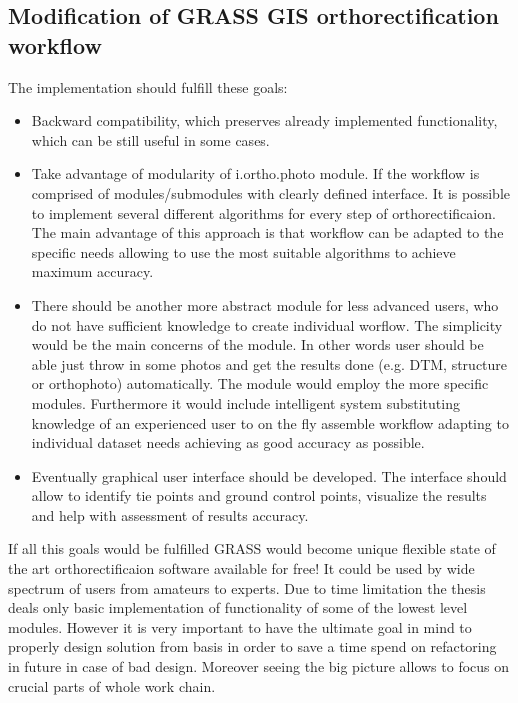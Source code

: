 \documentclass[a4paper,12pt]{article}
\begin{document}
\subsection{Modification of GRASS GIS orthorectification workflow}

The implementation should fulfill these goals:

\begin{itemize}
\item Backward compatibility, which preserves already implemented functionality, which
can be still useful in some cases. 
\item Take advantage of modularity of i.ortho.photo module.
If the workflow is comprised of modules/submodules with clearly defined interface. It is possible to implement
several different algorithms for every step of orthorectificaion. The main advantage of this 
approach is that workflow can be adapted to the specific needs allowing to use 
the most suitable algorithms to achieve maximum accuracy.
\item There should be another more abstract module for less advanced users, who do not have sufficient knowledge to create individual 
worflow. The simplicity would be the main concerns of the module. In other words user should be able just throw in   
 some photos and get the results done (e.g. DTM, structure or orthophoto) automatically. 
The module would employ the more specific modules. Furthermore it would include intelligent system 
substituting knowledge of an experienced user to on the fly assemble workflow adapting to individual 
dataset needs achieving as good accuracy as possible.
\item Eventually graphical user interface should be developed. The interface should 
allow to identify tie points and ground control points, visualize the results and help with assessment of results accuracy.  
\end{itemize}

If all this goals would be fulfilled GRASS would become unique flexible state of the art orthorectificaion 
software available for free! It could be used by wide spectrum of users from amateurs to experts.
Due to time limitation the thesis deals only basic implementation of functionality of some of the lowest level modules. 
However it is very important to have 
the ultimate goal in mind to properly design solution from basis in order to save a time spend on refactoring in future
 in case of bad design. Moreover seeing the big picture allows to focus on crucial parts of whole work chain.
\end{document}

